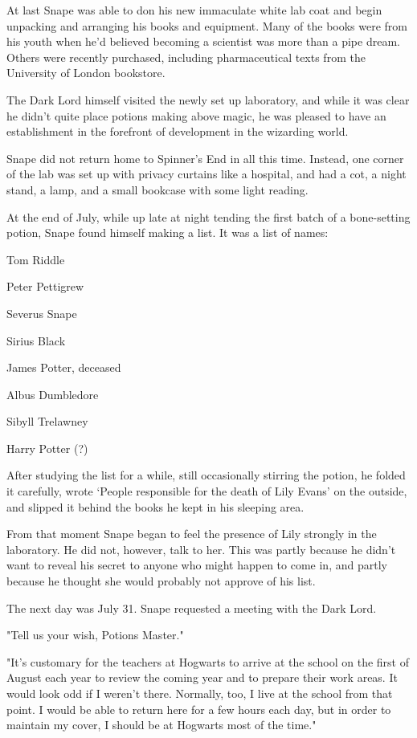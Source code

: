 At last Snape was able to don his new immaculate white lab coat and begin unpacking and arranging his books and equipment. Many of the books were from his youth when he'd believed becoming a scientist was more than a pipe dream. Others were recently purchased, including pharmaceutical texts from the University of London bookstore.

The Dark Lord himself visited the newly set up laboratory, and while it was clear he didn't quite place potions making above magic, he was pleased to have an establishment in the forefront of development in the wizarding world.

Snape did not return home to Spinner's End in all this time. Instead, one corner of the lab was set up with privacy curtains like a hospital, and had a cot, a night stand, a lamp, and a small bookcase with some light reading.

At the end of July, while up late at night tending the first batch of a bone-setting potion, Snape found himself making a list. It was a list of names:

\begin{writtenNote}

Tom Riddle

Peter Pettigrew

Severus Snape

Sirius Black

James Potter, deceased

Albus Dumbledore

Sibyll Trelawney

Harry Potter (?)

\end{writtenNote}

After studying the list for a while, still occasionally stirring the potion, he folded it carefully, wrote `People responsible for the death of Lily Evans' on the outside, and slipped it behind the books he kept in his sleeping area.

From that moment Snape began to feel the presence of Lily strongly in the laboratory. He did not, however, talk to her. This was partly because he didn't want to reveal his secret to anyone who might happen to come in, and partly because he thought she would probably not approve of his list.

The next day was July 31. Snape requested a meeting with the Dark Lord.

"Tell us your wish, Potions Master."

"It's customary for the teachers at Hogwarts to arrive at the school on the first of August each year to review the coming year and to prepare their work areas. It would look odd if I weren't there. Normally, too, I live at the school from that point. I would be able to return here for a few hours each day, but in order to maintain my cover, I should be at Hogwarts most of the time."

